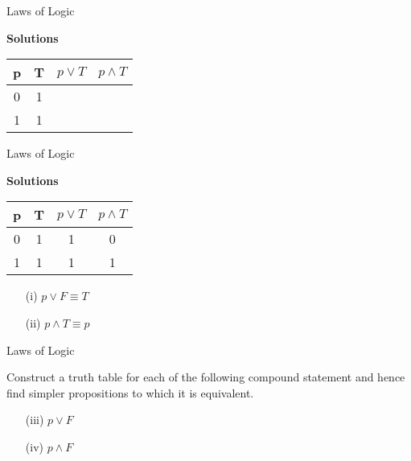 \documentclass[12pt]{article}
\begin{document}

{Laws of Logic}

\textbf{Solutions}
\begin{center}

\begin{tabular}{|c|c||c||c|}
\hline  \phantom{sp}p\phantom{sp}&  \phantom{sp}T\phantom{sp}& $p \vee T$ & $ p \wedge T$ \\ \hline
\hline  0 & 1 &  &  \\ 
\hline  1 &  1 &  &  \\ 
\hline 
\end{tabular} 
\end{center}



{Laws of Logic}

\textbf{Solutions}
\begin{center}

\begin{tabular}{|c|c||c||c|}
\hline  \phantom{sp}p\phantom{sp}&  \phantom{sp}T\phantom{sp}& $p \vee T$ & $ p \wedge T$ \\ \hline
\hline  0 & 1 & 1 & 0 \\ 
\hline  1 &  1 & 1 & 1 \\ 
\hline 
\end{tabular} 
\end{center}
\begin{itemize}
\item[(i)] $p \vee F \equiv T$
\item[(ii)] $p \wedge T \equiv p$
\end{itemize}




{Laws of Logic}

Construct a truth table for each of the following compound statement and hence find simpler propositions to which it is equivalent.


\begin{itemize}
\item[(iii)] $p \vee F$
\item[(iv)] $p \wedge F$
\end{itemize}
\end{document}

